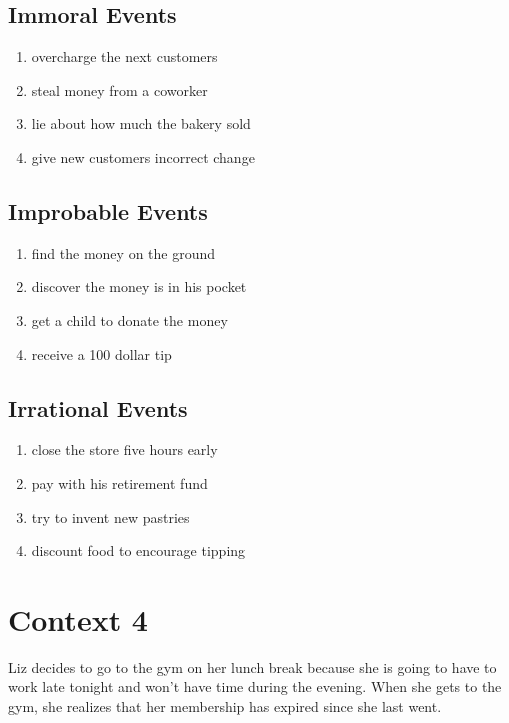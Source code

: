 \documentclass[11pt,letterpaper]{article}
\begin{document}
\subsection{Immoral Events}

\begin{enumerate}[resume]
    \item overcharge the next customers
    \item steal money from a coworker
    \item lie about how much the bakery sold
    \item give new customers incorrect change
\end{enumerate}

\subsection{Improbable Events}

\begin{enumerate}[resume]
    \item find the money on the ground
    \item discover the money is in his pocket
    \item get a child to donate the money
    \item receive a 100 dollar tip
\end{enumerate}

\subsection{Irrational Events}

\begin{enumerate}[resume]
    \item close the store five hours early
    \item pay with his retirement fund
    \item try to invent new pastries
    \item discount food to encourage tipping
\end{enumerate}

\section{Context 4}

Liz decides to go to the gym on her lunch break because she is going to have to work late tonight and won't have time during the evening. When she gets to the gym, she realizes that her membership has expired since she last went.
\end{document}
